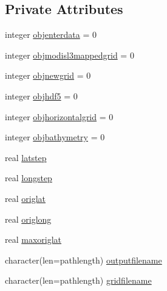 \subsection*{Private Attributes}
\begin{DoxyCompactItemize}
\item 
integer \mbox{\hyperlink{structmoduleconvertmodisl3mapped_1_1t__modisl3mappedformat_a40db97914385af557b1d0f03a5cea79d}{objenterdata}} = 0
\item 
integer \mbox{\hyperlink{structmoduleconvertmodisl3mapped_1_1t__modisl3mappedformat_abda5f0dbea7ea3b34abe53d593de5b53}{objmodisl3mappedgrid}} = 0
\item 
integer \mbox{\hyperlink{structmoduleconvertmodisl3mapped_1_1t__modisl3mappedformat_a6c8a2b5ee30846f46dcfe67f9e5d5b44}{objnewgrid}} = 0
\item 
integer \mbox{\hyperlink{structmoduleconvertmodisl3mapped_1_1t__modisl3mappedformat_ad10da6b8f890a37039c39ca06dc11df2}{objhdf5}} = 0
\item 
integer \mbox{\hyperlink{structmoduleconvertmodisl3mapped_1_1t__modisl3mappedformat_a3bc098e7219731235af054e97bcaa61d}{objhorizontalgrid}} = 0
\item 
integer \mbox{\hyperlink{structmoduleconvertmodisl3mapped_1_1t__modisl3mappedformat_a439e965f3535ed8e6f641852d5939c76}{objbathymetry}} = 0
\item 
real \mbox{\hyperlink{structmoduleconvertmodisl3mapped_1_1t__modisl3mappedformat_ae454cd1229177351468d331b1229d73e}{latstep}}
\item 
real \mbox{\hyperlink{structmoduleconvertmodisl3mapped_1_1t__modisl3mappedformat_ac917696b1ebb69153f89c5ae2749601b}{longstep}}
\item 
real \mbox{\hyperlink{structmoduleconvertmodisl3mapped_1_1t__modisl3mappedformat_ad4cf4d8ed5297a9017289a0c0ede6633}{origlat}}
\item 
real \mbox{\hyperlink{structmoduleconvertmodisl3mapped_1_1t__modisl3mappedformat_aa25cb238124d373d22247ad80209bcde}{origlong}}
\item 
real \mbox{\hyperlink{structmoduleconvertmodisl3mapped_1_1t__modisl3mappedformat_a616b929e6bf89e4afe1ef4469c5c1602}{maxoriglat}}
\item 
character(len=pathlength) \mbox{\hyperlink{structmoduleconvertmodisl3mapped_1_1t__modisl3mappedformat_a83005ba505641781d60d5bc1fab7595b}{outputfilename}}
\item 
character(len=pathlength) \mbox{\hyperlink{structmoduleconvertmodisl3mapped_1_1t__modisl3mappedformat_a19823b00bb6a0ed19189469c05867ad9}{gridfilename}}

\end{DoxyCompactItemize}
